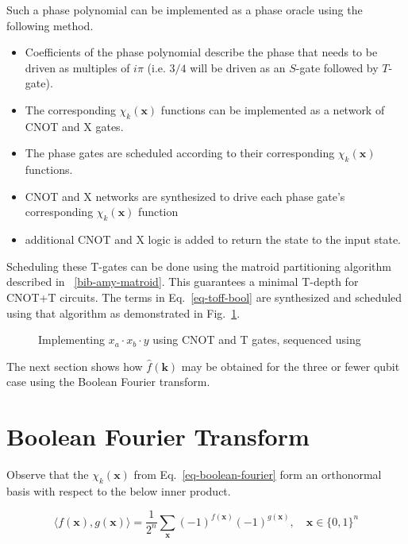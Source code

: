 Such a phase polynomial can be implemented as a phase oracle using the following
method.

\begin{itemize}
\item Coefficients of the phase polynomial describe the phase that needs to be driven
  as multiples of $i\pi$ (i.e. $3/4$ will be driven as an $S$-gate followed by $T$-gate).
\item The corresponding $\chi_k(\mathbf{x})$ functions can be implemented as a network
  of CNOT and X gates.
\item The phase gates are scheduled according to their corresponding $\chi_k(\mathbf{x})$
  functions.
\item CNOT and X networks are synthesized to drive each phase gate's corresponding
  $\chi_k(\mathbf{x})$ function
\item additional CNOT and X logic is added to return the state to the input state.
\end{itemize}

Scheduling these T-gates can be done using the matroid partitioning algorithm described in
~\ref{bib-amy-matroid}. This guarantees a minimal T-depth for CNOT+T circuits.
The terms in Eq.~\ref{eq-toff-bool} are synthesized and scheduled using that algorithm as
demonstrated in Fig.~\ref{fig-toff-mark-matroid}.
\begin{figure}[t]
  \centering
  \scalebox{0.7} {
    
  }
  \caption{Implementing $x_a \cdot x_b \cdot y$ using CNOT and T gates, sequenced using~\cite{bib-amy-matroid}}
  \label{fig-toff-mark-matroid}
\end{figure}

The next section shows how $\hat{f}(\mathbf{k})$ may be obtained for the three or fewer qubit case using the
Boolean Fourier transform.

\section{Boolean Fourier Transform}

Observe that the $\chi_k(\mathbf{x})$ from Eq.~\ref{eq-boolean-fourier} form an orthonormal basis with respect
to the below inner product.

\begin{equation}
  \label{eq-inner-prod}
  \langle f(\mathbf{x}) , g(\mathbf{x}) \rangle = \frac{1}{2^n} \sum_{\mathbf{x}} (-1)^{f(\mathbf{x})} (-1)^{g(\mathbf{x})}, \quad \mathbf{x} \in \{0,1\}^n
\end{equation}

